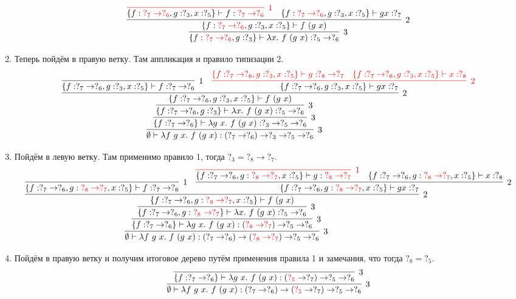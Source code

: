 \documentclass[12pt, a4paper] {article}
\begin{document}
\begin{enumerate}
$${{      \infer[3]{\{f: {\color{red} ?_7 \to ?_6}, g: ?_3\} \vdash \lambda x.~f~(g~x) : ?_5 \to ?_6 }{
      \infer[2]{\{f: {\color{red} ?_7 \to ?_6}, g: ?_3, x: ?_5\} \vdash f~(g~x) }{
               {\color{red} \infer[1]{\color{defaultcolor} \{f: {\color{red} ?_7 \to ?_6}, g: ?_3, x: ?_5\} \vdash f : {\color{red} ?_7 \to ?_6}}{}} &
                \{f: {\color{red} ?_7 \to ?_6}, g: ?_3, x: ?_5\} \vdash g x : ?_7
      }}}}$$
  \item Теперь пойдём в правую ветку. Там аппликация и правило типизации 2. {\scriptsize
    $$\infer[3]{\emptyset \vdash \lambda f~g~x.~f~(g~x) : (?_7 \to ?_6) \to ?_3 \to ?_5 \to ?_6}{
      \infer[3]{\{f: ?_7 \to ?_6\} \vdash \lambda g~x.~f~(g~x) : ?_3 \to ?_5 \to ?_6}{
      \infer[3]{\{f: ?_7 \to ?_6, g: ?_3\} \vdash \lambda x.~f~(g~x) : ?_5 \to ?_6 }{
      \infer[2]{\{f: ?_7 \to ?_6, g: ?_3, x: ?_5\} \vdash f~(g~x) }{
               \infer[1]{\{f: ?_7 \to ?_6, g: ?_3, x: ?_5\} \vdash f : ?_7 \to ?_6}{} &
      {\color{red} \infer[2]{\color{defaultcolor} \{f: ?_7 \to ?_6, g: ?_3, x: ?_5\} \vdash g x : ?_7}{
               \{f: ?_7 \to ?_6, g: ?_3, x: ?_5\} \vdash g : ?_8 \to ?_7 &
               \{f: ?_7 \to ?_6, g: ?_3, x: ?_5\} \vdash x : ?_8
      }}}}}}$$ }
  \item Пойдём в левую ветку. Там применимо правило 1, тогда $?_3 = ?_8 \to ?_7$.{\scriptsize
    $$\infer[3]{\emptyset \vdash \lambda f~g~x.~f~(g~x) : (?_7 \to ?_6) \to ({\color{red} ?_8 \to ?_7}) \to ?_5 \to ?_6}{
      \infer[3]{\{f: ?_7 \to ?_6\} \vdash \lambda g~x.~f~(g~x) : ({\color{red} ?_8 \to ?_7}) \to ?_5 \to ?_6}{
      \infer[3]{\{f: ?_7 \to ?_6, g: {\color{red} ?_8 \to ?_7}\} \vdash \lambda x.~f~(g~x) : ?_5 \to ?_6 }{
      \infer[2]{\{f: ?_7 \to ?_6, g: {\color{red} ?_8 \to ?_7}, x: ?_5\} \vdash f~(g~x) }{
               \infer[1]{\{f: ?_7 \to ?_6, g: {\color{red} ?_8 \to ?_7}, x: ?_5\} \vdash f : ?_7 \to ?_6}{} &
      \infer[2]{\{f: ?_7 \to ?_6, g: {\color{red} ?_8 \to ?_7}, x: ?_5\} \vdash g x : ?_7}{
               {\color{red} \infer[1]{\color{defaultcolor} \{f: ?_7 \to ?_6, g: {\color{red} ?_8 \to ?_7}, x: ?_5\} \vdash g : {\color{red} ?_8 \to ?_7}}{}} &
               \{f: ?_7 \to ?_6, g: {\color{red} ?_8 \to ?_7}, x: ?_5\} \vdash x : ?_8
      }}}}}$$}
  \item Пойдём в правую ветку и получим итоговое дерево путём применения
    правила 1 и замечания, что тогда $?_8 = ?_5$.{\scriptsize
    $$\infer[3]{\emptyset \vdash \lambda f~g~x.~f~(g~x) : (?_7 \to ?_6) \to ({\color{red} ?_5} \to ?_7) \to ?_5 \to ?_6}{
      \infer[3]{\{f: ?_7 \to ?_6\} \vdash \lambda g~x.~f~(g~x) : ({\color{red} ?_5} \to ?_7) \to ?_5 \to ?_6}{
}}$$}
\end{enumerate}
\end{document}
